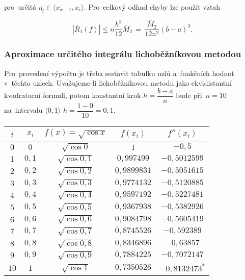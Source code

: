 \documentclass[a4paper,10pt]{article}
\begin{document}
pro~určitá $\eta_i\in\langle x_{x-1}, x_i \rangle$. Pro~celkový odhad chyby lze použít
vztah

\begin{equation}
\label{eq:err}
|\bar{R}_1(f)|\leq{n}\dfrac{h^3}{12}\bar{M}_2\,=\,\dfrac{\bar{M}_2}{12n^2}(b-a)^3.
\end{equation}

\newpage
\subsubsection{Aproximace určitého integrálu lichoběžníkovou metodou}
\par Pro~provedení výpočtu je třeba sestavit tabulku uzlů a~funkčních hodnot v~těchto
uzlech. Uvažujeme-li lichoběžníkovou metodu jako ekvidistantní kvadraturní formuli, potom
konstantní krok $h=\dfrac{b-a}{n}$ bude při~$n=10$ na~intervalu $\langle 0, 1 \rangle$
$h=\dfrac{1-0}{10}=0,1$.

\begin{center}
	\def\arraystretch{1.5}
	\begin{tabular}{|c||c|c|c|c|}
		\hline
			$i$ & $x_i$ & $f(x)=\sqrt{\cos{x}}$ & $f(x_i)$ & $f''(x_i)$ \\
			\hline\hline
			$0$ & $0$ & $\sqrt{\cos{0}}$ & $1$ & $-0,5$ \\
			\hline
			$1$ & $0,1$ & $\sqrt{\cos{0,1}}$ & $0,997499$ & $-0,5012599$ \\
			\hline
			$2$ & $0,2$ & $\sqrt{\cos{0,2}}$ & $0,9899831$ & $-0,5051615$ \\
			\hline
			$3$ & $0,3$ & $\sqrt{\cos{0,3}}$ & $0,9774132$ & $-0,5120885$ \\
			\hline
			$4$ & $0,4$ & $\sqrt{\cos{0,4}}$ & $0,9597192$ & $-0,5227481$ \\
			\hline
			$5$ & $0,5$ & $\sqrt{\cos{0,5}}$ & $0,9367938$ & $-0,5382926$ \\
			\hline
			$6$ & $0,6$ & $\sqrt{\cos{0,6}}$ & $0,9084798$ & $-0,5605419$ \\
			\hline
			$7$ & $0,7$ & $\sqrt{\cos{0,7}}$ & $0,8745526$ & $-0,592389$ \\
			\hline
			$8$ & $0,8$ & $\sqrt{\cos{0,8}}$ & $0,8346896$ & $-0,63857$ \\
			\hline
			$9$ & $0,9$ & $\sqrt{\cos{0,9}}$ & $0,7884225$ & $-0,7072147$ \\
			\hline
			$10$ & $1$ & $\sqrt{\cos{1}}$ & $0,7350526$ & $-0,8132473^{*}$ \\
			
		\hline
	\end{tabular}
\end{center}
\end{document}
